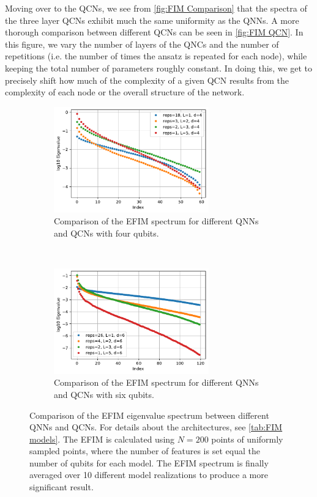 Moving over to the QCNs, we see from \autoref{fig:FIM Comparison} that the spectra of the three layer QCNs exhibit much the same uniformity as the QNNs. A more thorough comparison between different QCNs can be seen in \autoref{fig:FIM QCN}. In this figure, we vary the number of layers of the QNCs and the number of repetitions (i.e. the number of times the ansatz is repeated for each node), while keeping the total number of parameters roughly constant. In doing this, we get to precisely shift how much of the complexity of a given QCN results from the complexity of each node or the overall structure of the network.

\begin{figure}[H]
    \centering
    \begin{subfigure}[t]{0.45\textwidth}
        \centering
        \includegraphics[height=1.8in]{latex/figures/FIM_qubits_4_comparison.pdf}
        \caption{Comparison of the EFIM spectrum for different QNNs and QCNs with four qubits.}
        \label{fig:FIM QCN a}
    \end{subfigure}%
    ~ 
    \begin{subfigure}[t]{0.45\textwidth}
        \centering
        \includegraphics[height=1.8in]{latex/figures/FIM_qubits_6_comparison.pdf}
        \caption{Comparison of the EFIM spectrum for different QNNs and QCNs with six qubits.}
        \label{fig:FIM QCN b}
    \end{subfigure}
    \caption{Comparison of the EFIM eigenvalue spectrum between different QNNs and QCNs. For details about the architectures, see \autoref{tab:FIM models}. The EFIM is calculated using $N=200$ points of uniformly sampled points, where the number of features is set equal the number of qubits for each model. The EFIM spectrum is finally averaged over 10 different model realizations to produce a more significant result.}
    \label{fig:FIM QCN}
\end{figure}

